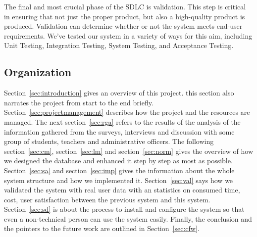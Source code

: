 The final and most crucial phase of the SDLC is validation. This step is critical in ensuring that not just the proper product, but also a high-quality product is produced. Validation can determine whether or not the system meets end-user requirements. We've tested our system in a variety of ways for this aim, including Unit Testing, Integration Testing, System Testing, and Acceptance Testing.

\subsection{Organization}
Section~\ref{sec:introduction} gives an overview of this project. this section also narrates the project from start to the end briefly. Section~\ref{sec:projectmanagement} describes how the project and the resources are managed. The next section~\ref{sec:rga} refers to the results of the analysis of the information gathered from the surveys, interviews and discussion with some group of students, teachers and administrative officers. The following section~\ref{sec:cm}, section~\ref{sec:lm} and section~\ref{sec:norm} gives the overview of how we designed the database and enhanced it step by step as most as possible. Section~\ref{sec:sa} and section~\ref{sec:imp} gives the information about the whole system structure and how we implemented it. Section~\ref{sec:val} says how we validated the system with real user data with an statistics on consumed time, cost, user satisfaction between the previous system and this system. Section~\ref{sec:sd} is about the process to install and configure the system so that even a non-technical person can use the system easily. Finally, the conclusion and the pointers to the future work are outlined in Section~\ref{sec:cfw}.

\clearpage